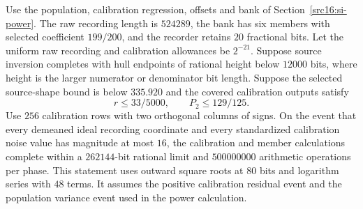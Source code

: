 \begin{proposition}
\label{cc16:completion}
Use the population, calibration regression, offsets and bank of Section~\ref{src16:si-power}. The raw recording length is $524289$, the bank has six members with selected coefficient $199/200$, and the recorder retains $20$ fractional bits. Let the uniform raw recording and calibration allowances be $2^{-21}$. Suppose source inversion completes with hull endpoints of rational height below $12000$ bits, where height is the larger numerator or denominator bit length. Suppose the selected source-shape bound is below $335.920$ and the covered calibration outputs satisfy
\[
 r\le33/5000,\qquad P_2\le129/125.
\]
Use $256$ calibration rows with two orthogonal columns of signs. On the event that every demeaned ideal recording coordinate and every standardized calibration noise value has magnitude at most $16$, the calibration and member calculations complete within a $262144$-bit rational limit and $500000000$ arithmetic operations per phase. This statement uses outward square roots at $80$ bits and logarithm series with $48$ terms. It assumes the positive calibration residual event and the population variance event used in the power calculation.
\end{proposition}
